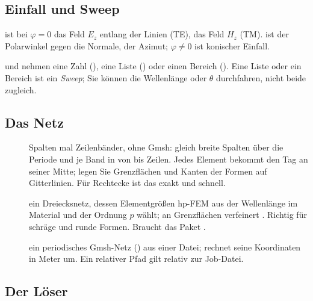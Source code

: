 \subsection{Einfall und Sweep}\label{sec:hp-sweep}

  ist bei $\varphi = 0$ das Feld $E_z$ entlang der Linien (TE),
 das Feld $H_z$ (TM).  ist der Polarwinkel gegen die Normale,
 der Azimut; $\varphi \neq 0$ ist konischer Einfall.

 und  nehmen eine Zahl (), eine Liste
() oder einen Bereich  (). Eine
Liste oder ein Bereich ist ein \emph{Sweep}; Sie können die Wellenlänge oder $\theta$
durchfahren, nicht beide zugleich.

\subsection{Das Netz}\label{sec:hp-netz}

\begin{description}
  \item[] Spalten mal Zeilenbänder, ohne Gmsh:  gleich
    breite Spalten über die Periode und je Band in  von
     bis   Zeilen. Jedes Element bekommt den Tag an seiner Mitte; legen
    Sie Grenzflächen und Kanten der Formen auf Gitterlinien. Für Rechtecke ist das exakt und
    schnell.
  \item[] ein Dreiecksnetz, dessen Elementgrößen hp-FEM aus der Wellenlänge im Material
    und der Ordnung $p$ wählt; an Grenzflächen verfeinert . Richtig
    für schräge und runde Formen. Braucht das Paket .
  \item[] ein periodisches Gmsh-Netz () aus einer Datei;  rechnet seine Koordinaten in Meter um. Ein relativer Pfad gilt relativ zur
    Job-Datei.
\end{description}

\subsection{Der Löser}\label{sec:hp-loeser}


